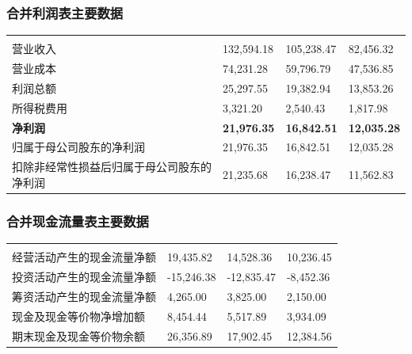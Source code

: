 \subsubsection{合并利润表主要数据}

\begin{gstab}
\begin{longtable}{|L{49mm}|R{29mm}|R{29mm}|R{29mm}|}
\hline
{} &  &  &  \\ \hline
\endfirsthead
\hline
{} &  &  &  \\ \hline
\endhead
营业收入 & 132,594.18 & 105,238.47 & 82,456.32 \\ \hline
营业成本 & 74,231.28 & 59,796.79 & 47,536.85 \\ \hline
利润总额 & 25,297.55 & 19,382.94 & 13,853.26 \\ \hline
所得税费用 & 3,321.20 & 2,540.43 & 1,817.98 \\ \hline
{\bfseries 净利润} & {\bfseries 21,976.35} & {\bfseries 16,842.51} & {\bfseries 12,035.28} \\ \hline
归属于母公司股东的净利润 & 21,976.35 & 16,842.51 & 12,035.28 \\ \hline
扣除非经常性损益后归属于母公司股东的净利润 & 21,235.68 & 16,238.47 & 11,562.83 \\ \hline
\end{longtable}
\end{gstab}

\subsubsection{合并现金流量表主要数据}

\begin{gstab}
\begin{longtable}{|L{49mm}|R{29mm}|R{29mm}|R{29mm}|}
\hline
{} &  &  &  \\ \hline
\endfirsthead
\hline
{} &  &  &  \\ \hline
\endhead
经营活动产生的现金流量净额 & 19,435.82 & 14,528.36 & 10,236.45 \\ \hline
投资活动产生的现金流量净额 & -15,246.38 & -12,835.47 & -8,452.36 \\ \hline
筹资活动产生的现金流量净额 & 4,265.00 & 3,825.00 & 2,150.00 \\ \hline
现金及现金等价物净增加额 & 8,454.44 & 5,517.89 & 3,934.09 \\ \hline
期末现金及现金等价物余额 & 26,356.89 & 17,902.45 & 12,384.56 \\ \hline
\end{longtable}
\end{gstab}

